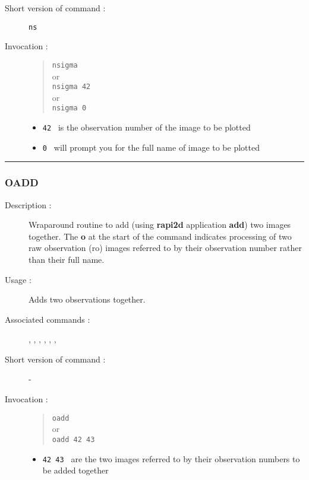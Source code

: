 \begin{description}
\item[Short version of command :] {\tt ns}
\item[Invocation :]

\begin{quote}{\tt  nsigma }\\
or \\
{\tt nsigma 42 }\\
or \\
{\tt nsigma 0 }
\end{quote}

\begin{itemize}
\item {\tt 42 } is the observation number of the image to be plotted
\item {\tt 0 } will prompt you for the full name of image to be plotted
\end{itemize}

\end{description}

\hrule 
\subsubsection*{\label{OADD}OADD}

\begin{description}

\item[Description :] Wraparound routine to add (using {\bf rapi2d}
application {\bf add}) two images together.  The {\bf o} at the start of the
command indicates processing of two raw observation ({\sc ro}) images
referred to by their observation number rather than their full name.

\item[Usage :] Adds two observations together.

\item[Associated commands :] {\tt {}}, 
{\tt {}}, {\tt {}}, 
{\tt {}}, {\tt {}}, 
{\tt {}}, {\tt {}}

\item[Short version of command :] -
\item[Invocation :]

\begin{quote}{\tt  oadd }\\
or \\
{\tt oadd 42 43 }
\end{quote}

\begin{itemize}

\item {\tt 42 43 } are the two images referred to by their observation
 numbers to be added together
\end{itemize}

\end{description}

